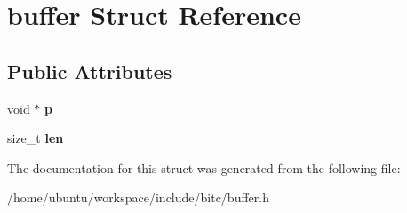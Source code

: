 \hypertarget{structbuffer}{\section{buffer Struct Reference}
\label{structbuffer}
}
\subsection*{Public Attributes}
\begin{DoxyCompactItemize}
\item 
\hypertarget{structbuffer_af67492063d0058eacdcff9996319f64b}{void $\ast$ {\bfseries p}}\label{structbuffer_af67492063d0058eacdcff9996319f64b}

\item 
\hypertarget{structbuffer_a2966e19c7a1355df268a743450746f8e}{size\-\_\-t {\bfseries len}}\label{structbuffer_a2966e19c7a1355df268a743450746f8e}

\end{DoxyCompactItemize}


The documentation for this struct was generated from the following file\-:\begin{DoxyCompactItemize}
\item 
/home/ubuntu/workspace/include/bitc/buffer.\-h\end{DoxyCompactItemize}
